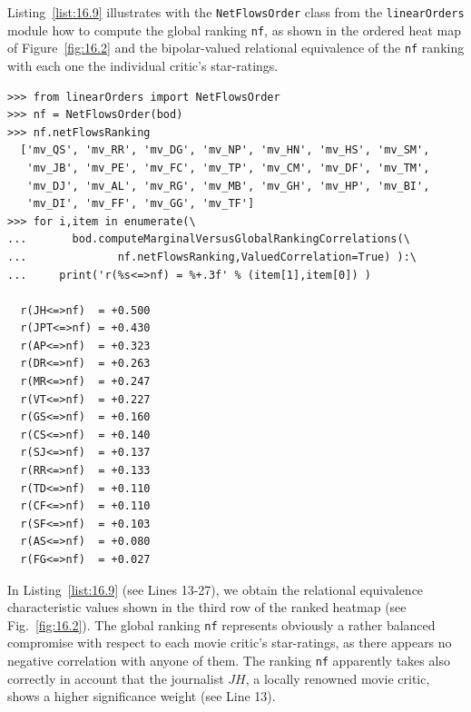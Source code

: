 Listing~\vref{list:16.9} illustrates with the \texttt{NetFlowsOrder} class  from the \texttt{linearOr\-ders} module how to compute the global \NetFlows ranking \texttt{nf}, as shown in the ordered heat map of Figure~\vref{fig:16.2} and the bipolar-valued relational equivalence of the \texttt{nf} ranking with each one the individual critic's star-ratings.
\begin{lstlisting}[caption={Computing marginal criterion correlations with global \NetFlows ranking},label=list:16.9]
>>> from linearOrders import NetFlowsOrder
>>> nf = NetFlowsOrder(bod)
>>> nf.netFlowsRanking
  ['mv_QS', 'mv_RR', 'mv_DG', 'mv_NP', 'mv_HN', 'mv_HS', 'mv_SM',
   'mv_JB', 'mv_PE', 'mv_FC', 'mv_TP', 'mv_CM', 'mv_DF', 'mv_TM',
   'mv_DJ', 'mv_AL', 'mv_RG', 'mv_MB', 'mv_GH', 'mv_HP', 'mv_BI',
   'mv_DI', 'mv_FF', 'mv_GG', 'mv_TF']
>>> for i,item in enumerate(\
...       bod.computeMarginalVersusGlobalRankingCorrelations(\
...              nf.netFlowsRanking,ValuedCorrelation=True) ):\
...     print('r(%s<=>nf) = %+.3f' % (item[1],item[0]) )   

  r(JH<=>nf)  = +0.500
  r(JPT<=>nf) = +0.430
  r(AP<=>nf)  = +0.323
  r(DR<=>nf)  = +0.263
  r(MR<=>nf)  = +0.247
  r(VT<=>nf)  = +0.227
  r(GS<=>nf)  = +0.160
  r(CS<=>nf)  = +0.140
  r(SJ<=>nf)  = +0.137
  r(RR<=>nf)  = +0.133
  r(TD<=>nf)  = +0.110
  r(CF<=>nf)  = +0.110
  r(SF<=>nf)  = +0.103
  r(AS<=>nf)  = +0.080
  r(FG<=>nf)  = +0.027
\end{lstlisting}

In Listing~\vref{list:16.9} (see Lines 13-27), we obtain the relational equivalence characteristic values shown in the third row of the ranked heatmap (see Fig.~\vref{fig:16.2}). The global \NetFlows ranking \texttt{nf} represents obviously a rather balanced compromise with respect to each movie critic's star-ratings, as there appears no negative correlation with anyone of them. The ranking \texttt{nf} apparently takes also correctly in account that the journalist $JH$, a locally renowned movie critic, shows a higher significance weight (see Line 13).


